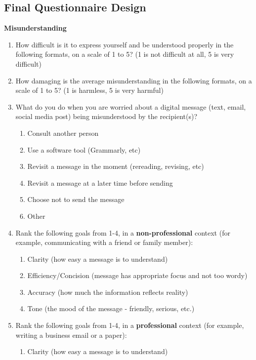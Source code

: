 \documentclass[acmsmall,screen,authorversion,nonacm]{acmart}
\begin{document}
\subsection{Final Questionnaire Design}
\label{final_Questionnaire_Design}
\textbf{Misunderstanding}
\begin{enumerate}
    \item How difficult is it to express yourself and be understood properly in the following formats, on a scale of 1 to 5? (1 is not difficult at all, 5 is very difficult)
    \item How damaging is the average misunderstanding in the following formats, on a scale of 1 to 5? (1 is harmless, 5 is very harmful)
    \item What do you do when you are worried about a digital message (text, email, social media post) being misunderstood by the recipient(s)? 
        \begin{enumerate}
            \item Consult another person
            \item Use a software tool (Grammarly, etc)
            \item Revisit a message in the moment (rereading, revising, etc)
            \item Revisit a message at a later time before sending
            \item Choose not to send the message
            \item Other
        \end{enumerate}
    \item Rank the following goals from 1-4, in a \textbf{non-professional} context (for example, communicating with a friend or family member):
        \begin{enumerate}
            \item Clarity (how easy a message is to understand)
            \item Efficiency/Concision (message has appropriate focus and not too wordy)
            \item Accuracy (how much the information reflects reality)
            \item Tone (the mood of the message - friendly, serious, etc.)
        \end{enumerate}
    \item Rank the following goals from 1-4, in a \textbf{professional} context (for example, writing a business email or a paper):
        \begin{enumerate}
            \item Clarity (how easy a message is to understand)

\end{enumerate}
\end{enumerate}
\end{document}
